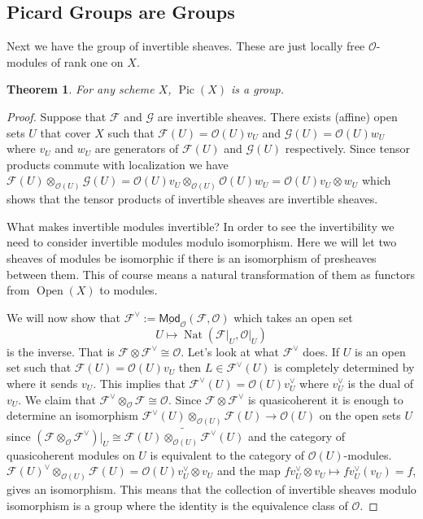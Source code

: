 \documentclass[12pt]{article}
\numberwithin{equation}{section}
\newtheorem{theorem}{Theorem}[subsection]
\theoremstyle{definition}
\theoremstyle{remark}
\newcommand{\Ocal}{\mathcal{O}}
\newcommand{\Pic}{\operatorname{Pic}}
\newcommand{\Fcal}{\mathcal{F}}
\newcommand{\Open}{\operatorname{Open}}
\newcommand{\Nat}{\operatorname{Nat}}
\begin{document}
\subsection{Picard Groups are Groups}
Next we have the group of invertible sheaves. These are just locally free $\Ocal$-modules of rank one on $X$.
\begin{theorem}
	For any scheme $X$, $\Pic(X)$ is a group.
\end{theorem}
\begin{proof}
	Suppose that $\mathcal F$ and $\mathcal G$ are invertible sheaves. There exists (affine) open sets $U$ that cover $X$ such that $\mathcal F(U) = \mathcal O(U) v_U$ and $\mathcal G(U) = \mathcal O(U) w_U $ where $v_U$ and $w_U$ are generators of $\mathcal F(U)$ and $\mathcal G(U)$ respectively. 
	Since tensor products commute with localization we have $\mathcal F(U)\otimes_{\mathcal O(U)} \mathcal G(U) = \mathcal O(U) v_U  \otimes_{\mathcal O(U)} \mathcal O(U) w_U  = \mathcal O(U)  v_U \otimes w_U$ which shows that the tensor products of invertible sheaves are invertible sheaves.
	
	What makes invertible modules invertible? In order to see the invertibility we need to consider invertible modules modulo isomorphism.
	Here we will let two sheaves of modules be isomorphic if there is an isomorphism of presheaves between them. This of course means a natural transformation of them as functors from $\Open(X)$ to modules. 
	
	We will now show that $\mathcal F^{\vee}:= \underline{\mathsf{Mod}}_{\mathcal O}(\mathcal F,\mathcal O)$ which takes an open set 
	$$U \mapsto \Nat(\mathcal F\vert_U, \mathcal O\vert_U )$$
	is the inverse.  That is $\Fcal\otimes\Fcal^{\vee} \cong \Ocal$.
	Let's look at what $\Fcal^{\vee}$ does. 
	If $U$ is an open set such that $\Fcal(U) = \Ocal(U) v_U $ then $L\in \Fcal^{\vee}(U)$ is completely determined by where it sends $v_U$. 
	This implies that $\Fcal^{\vee}(U)=\mathcal O(U) v_U^{\vee}$ where $v_U^{\vee}$ is the dual of $v_U$. We claim that $\mathcal F^{\vee}\otimes_{\mathcal O} \mathcal F\cong \mathcal O$. 
	Since $\mathcal F\otimes \Fcal^{\vee}$ is quasicoherent it is enough to determine an isomorphism $\mathcal F^{\vee}(U)\otimes_{\mathcal O(U)} \mathcal F(U) \to \mathcal O(U)$ on the open sets $U$ since $(\mathcal F\otimes_\mathcal O \mathcal F^{\vee})\vert_U \cong \widetilde{\mathcal F(U) \otimes_{\mathcal O(U)} \Fcal^{\vee}(U)}$ and the category of quasicoherent modules on $U$ is equivalent to the category of $\Ocal(U)$-modules. 
	$\mathcal F(U)^{\vee}\otimes_{\mathcal O(U)}\mathcal F(U) = \mathcal O(U) v_U^{\vee}\otimes v_U $ and the map $ f v_U^{\vee} \otimes v_U \mapsto f v_U^{\vee}(v_U) = f$, gives an isomorphism. 
	This means that the collection of invertible sheaves modulo isomorphism is a group where the identity is the equivalence class of $\mathcal O$.
\end{proof}
\end{document}
